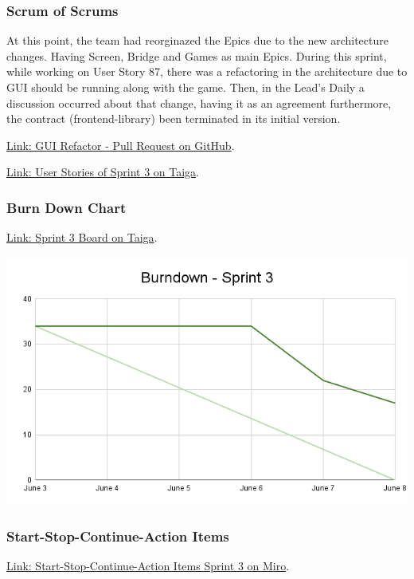 \hypertarget{sos-s3} {
\subsubsection{Scrum of Scrums}\label{Scrum of Scrums} 
At this point, the team had reorginazed the Epics due to the new architecture 
changes. Having Screen, Bridge and Games as main Epics.
During this sprint, while working on User Story 87, there was a refactoring 
in the architecture due to GUI should be running along with the game. 
Then, in the Lead's Daily a discussion occurred about that change, having it 
as an agreement furthermore, the contract (frontend-library) been terminated in its initial version.
}

\href{https://github.com/Pending-Name-21/arquitecture/pull/12}{Link: GUI Refactor - Pull Request on GitHub}.

\href{https://tree.taiga.io/project/joseluis-teran-coffeetime/taskboard/sprint-3-8974}{Link: User Stories of Sprint 3 on Taiga}.

\hypertarget{burndownchart-s3}{
\subsubsection{Burn Down Chart}\label{Burn Down Chart S3}}
\href{https://tree.taiga.io/project/joseluis-teran-coffeetime/taskboard/sprint-3-8974}{Link: Sprint 3 Board on Taiga}.

\includegraphics[width=\textwidth]{./artifacts/src/sprint-3/assets/Burndown-Sprint3.png}

\hypertarget{startstopcontinueactionitems-s3}{
\subsubsection{Start-Stop-Continue-Action Items}\label{Start-Stop-Continue-Action Items S3}}
\href{https://miro.com/app/board/uXjVKDO7l8M=/?moveToWidget=3458764590247889881&cot=14}{Link: Start-Stop-Continue-Action Items Sprint 3 on Miro}.

